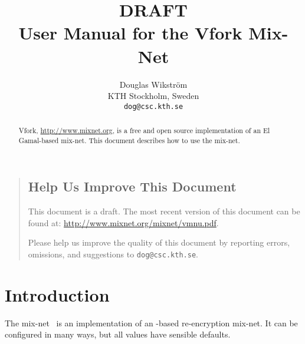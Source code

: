 \documentclass[11pt]{article}
\title{{\Huge DRAFT}\\$\quad$\\User Manual for the Vfork Mix-Net}
\author{Douglas Wikstr{\"o}m\\
KTH Stockholm, Sweden\\
\texttt{dog@csc.kth.se}}
\begin{document}


\maketitle

\thispagestyle{empty}

\begin{abstract}

  Vfork, \url{http://www.mixnet.org}, is a free and open
  source implementation of an El Gamal-based mix-net. This document
  describes how to use the mix-net.

\end{abstract}

\begin{quote}

\vfill

\subsection*{Help Us Improve This Document}

This document is a draft. The most recent version of this
document can be found at:
\url{http://www.mixnet.org/mixnet/vmnu.pdf}.

Please help us improve the quality of this document by reporting
errors, omissions, and suggestions to
\texttt{dog@csc.kth.se}.


\end{quote}

\newpage

\begin{spacing}{0.9}

\setcounter{tocdepth}{1}

  \tableofcontents

\end{spacing}

\clearpage

\pagestyle{plain}
\setcounter{page}{1}

\section{Introduction}\label{sect:introduction}

The \veri mix-net~\cite{vmn} is an implementation of an \elgamal-based
re-encryption mix-net. It can be configured in many ways, but all
values have sensible defaults.
\end{document}
